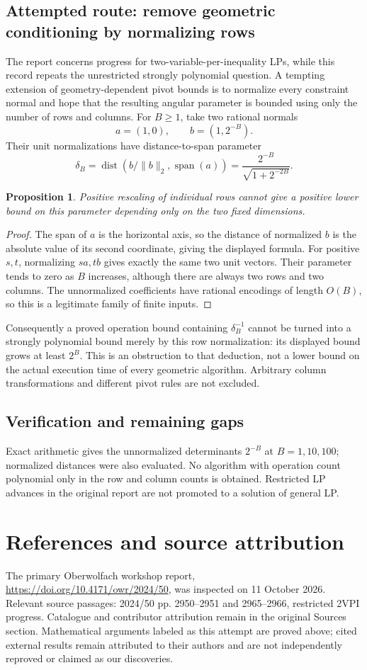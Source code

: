 \documentclass[11pt]{article}
\newtheorem{proposition}{Proposition}
\begin{document}
\subsection{Attempted route: remove geometric conditioning by normalizing rows}
The report concerns progress for two-variable-per-inequality LPs, while this record repeats the unrestricted strongly polynomial question. A tempting extension of geometry-dependent pivot bounds is to normalize every constraint normal and hope that the resulting angular parameter is bounded using only the number of rows and columns.
For $B\ge1$, take two rational normals
\[
 a=(1,0),\qquad b=(1,2^{-B}).
\]
Their unit normalizations have distance-to-span parameter
\[
 \delta_B=\operatorname{dist}\left(b/\|b\|_2,\operatorname{span}(a)\right)
 =\frac{2^{-B}}{\sqrt{1+2^{-2B}}}.
\]
\begin{proposition}
Positive rescaling of individual rows cannot give a positive lower bound on this parameter depending only on the two fixed dimensions.
\end{proposition}
\begin{proof}
The span of $a$ is the horizontal axis, so the distance of normalized $b$ is the absolute value of its second coordinate, giving the displayed formula. For positive $s,t$, normalizing $sa,tb$ gives exactly the same two unit vectors. Their parameter tends to zero as $B$ increases, although there are always two rows and two columns. The unnormalized coefficients have rational encodings of length $O(B)$, so this is a legitimate family of finite inputs.
\end{proof}
Consequently a proved operation bound containing $\delta_B^{-1}$ cannot be turned into a strongly polynomial bound merely by this row normalization: its displayed bound grows at least $2^B$. This is an obstruction to that deduction, not a lower bound on the actual execution time of every geometric algorithm. Arbitrary column transformations and different pivot rules are not excluded.
\subsection{Verification and remaining gaps}
Exact arithmetic gives the unnormalized determinants $2^{-B}$ at $B=1,10,100$; normalized distances were also evaluated. No algorithm with operation count polynomial only in the row and column counts is obtained. Restricted LP advances in the original report are not promoted to a solution of general LP.

\section{References and source attribution}
The primary Oberwolfach workshop report, \url{https://doi.org/10.4171/owr/2024/50}, was inspected on 11 October 2026. Relevant source passages: 2024/50 pp. 2950--2951 and 2965--2966, restricted 2VPI progress. Catalogue and contributor attribution remain in the original Sources section. Mathematical arguments labeled as this attempt are proved above; cited external results remain attributed to their authors and are not independently reproved or claimed as our discoveries.
\end{document}
